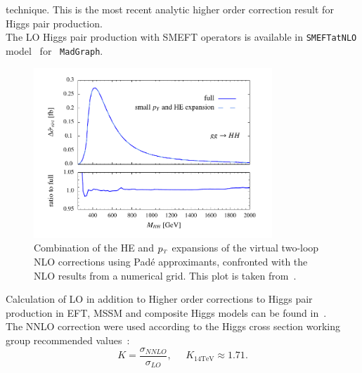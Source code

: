 technique.  This is the most recent analytic higher order correction result for Higgs pair production.\\
%
The LO Higgs pair production with SMEFT operators is available in \texttt{SMEFTatNLO} model~\cite{Degrande:2020evl} for ~\texttt{MadGraph}.

\begin{figure}[!htpb]
	\centering
	\includegraphics[width = 0.8\textwidth]{./figures/HH_NLO}
	\caption{Combination of the HE and $p_{\scriptscriptstyle T}$ expansions of the virtual two-loop NLO corrections using  Pad\'e  approximants,  confronted with the NLO results from a numerical grid. This plot is taken from~\cite{Bellafronte:2022jmo}. } 
	\label{dihiggs-gridplot}
\end{figure}
%
Calculation of LO in addition to Higher order corrections to Higgs pair production in EFT, MSSM and composite Higgs models can be found in~\cite{Grober:2010yv,Grober:2015cwa,Grober:2017gut,deFlorian:2017qfk,Buchalla:2018yce}.\\ 
The NNLO correction were used according to the Higgs cross section working group recommended values~\cite{Dittmaier:2012vm,deFlorian:2016spz}:
\begin{equation}
	K = \frac{\sigma_{NNLO}}{\sigma_{LO}}, \;\;\;\;\; K_{14 \mathrm{TeV}} \approx 1.71.
\end{equation}

